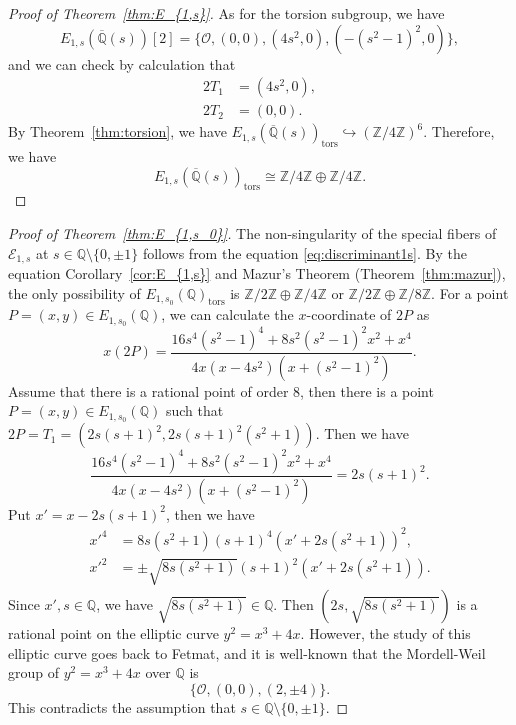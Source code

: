 \documentclass[main]{subfiles}
\begin{document}
\begin{proof}[Proof of Theorem~\ref{thm:E_{1,s}}]
    As for the torsion subgroup, we have
    \begin{equation*}
        E_{1,s}(\overline{\mathbb{Q}}(s))[2] = \{\mathcal{O}, (0,0), (4s^{2},0),( - (s^{2} - 1)^{2},0)\},
    \end{equation*}
    and we can check by calculation that
    \begin{align}
        2T_1 & = (4s^2,0), \\
        2T_2 & = (0,0).
    \end{align}
    By Theorem~\ref{thm:torsion}, we have $E_{1,s}(\overline{\mathbb{Q}}(s))_ \text{tors} \hookrightarrow (\mathbb{Z} / 4 \mathbb{Z})^{6}$.
    Therefore, we have
    \begin{equation*}
        E_{1,s}(\overline{\mathbb{Q}}(s))_ \text{tors} \cong \mathbb{Z} / 4 \mathbb{Z} \oplus \mathbb{Z} / 4 \mathbb{Z}.
    \end{equation*}
\end{proof}

\begin{proof}[Proof of Theorem~{\ref{thm:E_{1,s_0}}}]
    The non-singularity of the special fibers of $\mathcal{E}_{1,s}$ at $s \in \mathbb{Q} \setminus \{0,\pm 1 \}$ follows from the equation \eqref{eq:discriminant1s}.
    By the equation Corollary~\ref{cor:E_{1,s}} and Mazur's Theorem (Theorem~\ref{thm:mazur}), the only possibility of $E_{1,s_0}(\mathbb{Q})_{\text{tors}}$ is $\mathbb{Z} / 2 \mathbb{Z} \oplus \mathbb{Z} / 4 \mathbb{Z}$ or $\mathbb{Z} / 2 \mathbb{Z} \oplus \mathbb{Z} / 8 \mathbb{Z}$.
    For a point $P=(x,y) \in E_{1,s_0}(\mathbb{Q})$, we can calculate the $x$-coordinate of $2P$ as
    \begin{equation*}
        x(2P) = \frac{16s^{4}(s^{2} - 1)^{4} + 8 s^{2}(s^{2} - 1)^{2} x^{2} + x^{4}}{4 x (x - 4s^{2}) (x + (s^{2} - 1)^{2})}.
    \end{equation*}
    Assume that there is a rational point of order $8$, then there is a point $P=(x,y) \in E_{1,s_0}(\mathbb{Q})$ such that $2P = T_1 = (2s(s+1)^2, 2s(s+1)^2(s^2+1))$.
    Then we have
    \begin{equation*}
        \frac{16s^{4}(s^{2} - 1)^{4} + 8 s^{2}(s^{2} - 1)^{2} x^{2} + x^{4}}{4 x (x - 4s^{2}) (x + (s^{2} - 1)^{2})} = 2s(s + 1)^{2}.
    \end{equation*}
    Put $x' = x - 2s(s+1)^2$, then we have
    \begin{align*}
        x'^4 & = 8s(s^{2} + 1)(s + 1)^{4}(x' + 2s(s^2+1))^{2},        \\
        x'^2 & = \pm \sqrt{8 s (s^2 + 1)} (s+1)^{2} (x' + 2s(s^2+1)).
    \end{align*}
    Since $x', s \in \mathbb{Q}$, we have $\sqrt{8 s (s^2 + 1)} \in \mathbb{Q}$.
    Then $(2s, \sqrt{8 s (s^2 + 1)})$ is a rational point on the elliptic curve $y^2 = x^3 + 4x$.
    However, the study of this elliptic curve goes back to Fetmat, and it is well-known that the Mordell-Weil group of $y^2 = x^3 + 4x$ over $\mathbb{Q}$ is
    \begin{equation*}
        \{\mathcal{O}, (0,0), (2,\pm 4) \}.
    \end{equation*}
    This contradicts the assumption that $s \in \mathbb{Q} \setminus \{0,\pm 1 \}$.
\end{proof}
\end{document}
